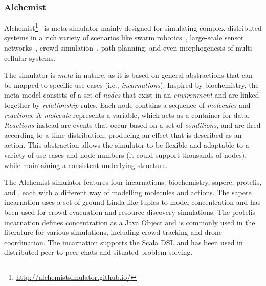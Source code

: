 \subsubsection{Alchemist}\label{coordination2023:alchemist}
Alchemist\footnote{\url{http://alchemistsimulator.github.io/}}~\cite{alchemist} is meta-simulator
 mainly designed for simulating complex distributed systems 
 in a rich variety of scenarios like swarm robotics~\cite{aguzzi2023macroswarm},
 large-scale sensor networks~\cite{Aguzzi_2022}, crowd simulation~\cite{aggregatecomputing},
 path planning, and even morphogenesis of multi-cellular systems.

The simulator is \emph{meta} in nature, 
 as it is based on general abstractions 
 that can be mapped to specific use cases (i.e., \emph{incarnations}).
% 
Inspired by biochemistry, 
 the meta-model consists of a set of \emph{nodes} 
 that exist in an \emph{environment} and are linked together by \emph{relationship} rules. 
 Each node contains a sequence of \emph{molecules} and \emph{reactions}. 
%
 A \emph{molecule} represents a variable, 
 which acts as a container for data. 
 \emph{Reactions} instead are events that occur based 
 on a set of \emph{conditions}, 
 and are fired according to a time distribution, 
 producing an effect that is described as an action. 
This abstraction allows the simulator to be flexible 
 and adaptable to a variety of use cases and node numbers 
 (it could support thousands of nodes), 
 while maintaining a consistent underlying structure.

 The Alchemist simulator features four incarnations: 
  biochemistry, sapere, protelis, and \scafi{}, 
  each with a different way of modelling molecules and actions. 
The sapere incarnation uses a set of ground Linda-like tuples 
 to model concentration and has been used for crowd evacuation and resource discovery simulations. 
The protelis incarnation defines concentration as a Java Object and is commonly used in the literature for various simulations, 
 including crowd tracking and drone coordination. 
The \scafi{} incarnation supports the \scafi{} Scala DSL 
 and has been used in distributed peer-to-peer chats and situated problem-solving.


